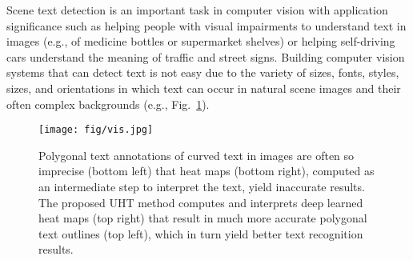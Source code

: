 \documentclass[10pt,twocolumn,letterpaper]{article}
\begin{document}
Scene text detection is an important task in computer vision with application significance such as helping people with visual impairments to understand text in images (e.g., of medicine bottles or supermarket shelves) or helping self-driving cars understand the meaning of traffic and street signs.
Building computer vision systems that can detect text is not easy due to the variety of sizes, fonts, styles, sizes, and orientations in which text can occur in natural scene images and their often complex backgrounds (e.g., Fig.~\ref{vis}). 

\begin{figure}[t]
\centering
\centering
\texttt{[image: fig/vis.jpg]}
\caption{Polygonal text annotations of curved text in images are often so imprecise (bottom left) that heat maps (bottom right), computed as an intermediate step to interpret the text, yield inaccurate results.  The proposed UHT method computes and interprets deep learned heat maps (top right) that result in much more accurate polygonal text outlines (top left), which in turn yield better text recognition results.
}
\label{vis}
\end{figure}
\end{document}
